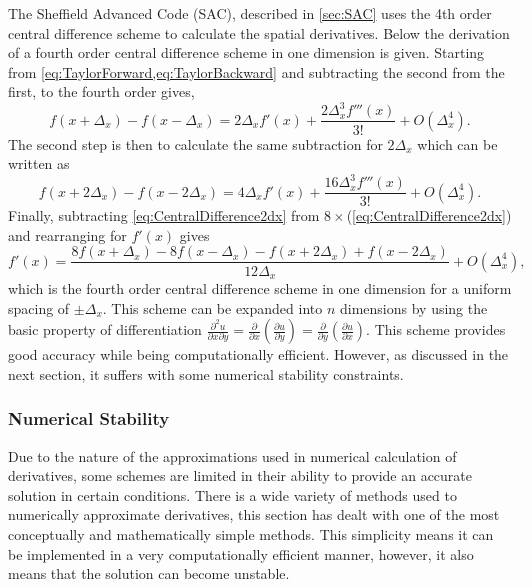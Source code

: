 The Sheffield Advanced Code (SAC), described in \cref{sec:SAC} uses the 4th order central difference scheme to calculate the spatial derivatives.
Below the derivation of a fourth order central difference scheme in one dimension is given.
Starting from \cref{eq:TaylorForward,eq:TaylorBackward} and subtracting the second from the first, to the fourth order gives,
\begin{equation}
f(x+\Delta_{x})-f(x-\Delta_{x})=2\Delta_{x}f'(x)+\frac{2\Delta_{x}^{3}f'''(x)}{3!}+O(\Delta_{x}^{4}).\label{eq:centraldifferencedx}
\end{equation}
The second step is then to calculate the same subtraction for $2\Delta_{x}$ which can be written as
\begin{equation}
f(x+2\Delta_{x})-f(x-2\Delta_{x})=4\Delta_{x}f'(x)+\frac{16\Delta_{x}^{3}f'''(x)}{3!}+O(\Delta_{x}^{4}).\label{eq:CentralDifference2dx}
\end{equation}
Finally, subtracting \cref{eq:CentralDifference2dx} from $8\times$(\cref{eq:CentralDifference2dx}) and rearranging for $f'(x)$ gives
\begin{equation}
f'(x)=\frac{8f(x+\Delta_{x})-8f(x-\Delta_{x})-f(x+2\Delta_{x})+f(x-2\Delta_{x})}{12\Delta_{x}}+O(\Delta_{x}^{4}),\label{eq:4thOrderCentralDifferenceUniform}
\end{equation}
which is the fourth order central difference scheme in one dimension for a uniform spacing of $\pm\Delta_{x}$.
This scheme can be expanded into $n$ dimensions by using the basic property of differentiation $\frac{\partial^{2}u}{\partial x\partial y}=\frac{\partial}{\partial x}\left(\frac{\partial u}{\partial y}\right)=\frac{\partial}{\partial y}\left(\frac{\partial u}{\partial x}\right)$.
This scheme provides good accuracy while being computationally efficient.
However, as discussed in the next section, it suffers with some numerical stability constraints.


\subsubsection{Numerical Stability}

Due to the nature of the approximations used in numerical calculation of derivatives, some schemes are limited in their ability to provide an accurate solution in certain conditions.
There is a wide variety of methods used to numerically approximate derivatives, this section has dealt with one of the most conceptually and mathematically simple methods.
This simplicity means it can be implemented in a very computationally efficient manner, however, it also means that the solution can become unstable.

